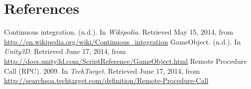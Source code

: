 \documentclass[11pt,twoside,a4paper]{article}
\begin{document}
\clearpage

\section*{References}
Continuous integration. (n.d.). In \textit{Wikipedia}. Retrieved May 15, 2014, from \url{http://en.wikipedia.org/wiki/Continuous_integration}
\newline \newline
GameObject. (n.d.). In \textit{Unity3D}. Retrieved June 17, 2014, from \url{http://docs.unity3d.com/ScriptReference/GameObject.html}
\newline \newline
Remote Procedure Call (RPC). 2009. In \textit{TechTarget}. Retrieved June 17, 2014, from \url{http://searchsoa.techtarget.com/definition/Remote-Procedure-Call}
\end{document}
